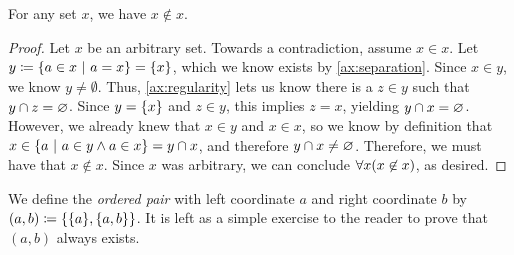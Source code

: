 \begin{theorem}
    For any set $x$, we have $x \not \in x$.
\end{theorem}
\begin{proof}
    Let $x$ be an arbitrary set.
    Towards a contradiction, assume $x \in x$.
    Let $y \defn \set*{a \in x \suchthat a = x} = \set*{x}$, which we know exists by \autoref{ax:separation}.
    Since $x \in y$, we know $y \neq \emptyset$.
    Thus, \autoref{ax:regularity} lets us know there is a $z \in y$ such that $y \cap z = \varnothing$.
    Since $y = \set*{x}$ and $z \in y$, this implies $z = x$, yielding $y \cap x = \varnothing$.
    However, we already knew that $x \in y$ and $x \in x$,
    so we know by definition that $x \in \set*{a \suchthat a \in y \meet a \in x} = y \intersect x$,
    and therefore $y \cap x \neq \varnothing$. \contradiction
    Therefore, we must have that $x \not \in x$.
    Since $x$ was arbitrary, we can conclude $\forall x \pn*{x \not \in x}$, as desired.
\end{proof}
% 

\begin{definition}
    We define the \emph{ordered pair} with left coordinate $a$ and right coordinate $b$
    by $(a, b) \defn \set*{\set*{a}, \set*{a, b}}$.
    It is left as a simple exercise to the reader to prove that $(a, b)$ always exists.
\end{definition}


